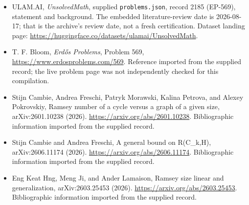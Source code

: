 \documentclass[11pt,a4paper]{article}
\begin{document}
{\small

\begin{itemize}

\item[\hypertarget{source:2185:1}{S1}] ULAM.AI, \emph{UnsolvedMath}, supplied \texttt{problems.json}, record 2185 (EP-569), statement and background. The embedded literature-review date is 2026-08-17; that is the archive’s review date, not a fresh certification. Dataset landing page: \url{https://huggingface.co/datasets/ulamai/UnsolvedMath}.

\item[\hypertarget{source:2185:2}{S2}] T. F. Bloom, \emph{Erdős Problems}, Problem 569, \url{https://www.erdosproblems.com/569}. Reference imported from the supplied record; the live problem page was not independently checked for this compilation.

\item[\hypertarget{source:2185:3}{S3}] Stijn Cambie, Andrea Freschi, Patryk Morawski, Kalina Petrova, and Alexey Pokrovskiy, Ramsey number of a cycle versus a graph of a given size, arXiv:2601.10238 (2026). \url{https://arxiv.org/abs/2601.10238}. Bibliographic information imported from the supplied record.

\item[\hypertarget{source:2185:4}{S4}] Stijn Cambie and Andrea Freschi, A general bound on R(C\_k,H), arXiv:2606.11174 (2026). \url{https://arxiv.org/abs/2606.11174}. Bibliographic information imported from the supplied record.

\item[\hypertarget{source:2185:5}{S5}] Eng Keat Hng, Meng Ji, and Ander Lamaison, Ramsey size linear and generalization, arXiv:2603.25453 (2026). \url{https://arxiv.org/abs/2603.25453}. Bibliographic information imported from the supplied record.

\end{itemize}

}

\label{end:2185}
\end{document}
